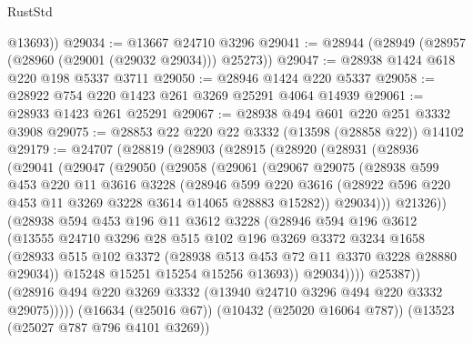 \begin{lexlean}{RustStd}
\begin{coremodule}
        @13693))
@29034 := @13667 @24710 @3296
@29041 := @28944 (@28949 (@28957 (@28960 (@29001 (@29032 @29034))) @25273))
@29047 := @28938 @1424 @618 @220 @198 @5337 @3711
@29050 := @28946 @1424 @220 @5337
@29058 := @28922 @754 @220 @1423 @261 @3269 @25291 @4064 @14939
@29061 := @28933 @1423 @261 @25291
@29067 := @28938 @494 @601 @220 @251 @3332 @3908
@29075 := @28853 @22 @220 @22 @3332 (@13598 (@28858 @22)) @14102
@29179 := @24707
    (@28819
      (@28903
        (@28915
          (@28920
            (@28931
              (@28936
                (@29041
                  (@29047
                    (@29050
                      (@29058
                        (@29061
                          (@29067
                            @29075
                            (@28938
                              @599
                              @453
                              @220
                              @11
                              @3616
                              @3228
                              (@28946
                                @599
                                @220
                                @3616
                                (@28922 @596 @220 @453 @11 @3269 @3228 @3614 @14065 @28883 @15282))
                              @29034)))
                        @21326))
                    (@28938
                      @594
                      @453
                      @196
                      @11
                      @3612
                      @3228
                      (@28946
                        @594
                        @196
                        @3612
                        (@13555
                          @24710
                          @3296
                          @28
                          @515
                          @102
                          @196
                          @3269
                          @3372
                          @3234
                          @1658
                          (@28933
                            @515
                            @102
                            @3372
                            (@28938 @513 @453 @72 @11 @3370 @3228 @28880 @29034))
                          @15248
                          @15251
                          @15254
                          @15256
                          @13693))
                      @29034))))
              @25387))
          (@28916 @494 @220 @3269 @3332 (@13940 @24710 @3296 @494 @220 @3332 @29075)))))
    (@16634 (@25016 @67))
    (@10432 (@25020 @16064 @787))
    (@13523 (@25027 @787 @796 @4101 @3269))

\end{coremodule}
\end{lexlean}
